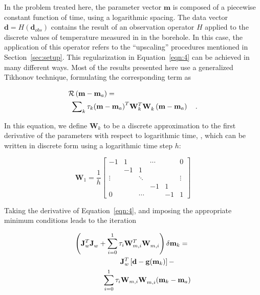 \documentclass[cp]{copernicus}
\begin{document}
In the problem treated here, the parameter vector $\mathbf{m}$ is composed of a piecewise constant 
function of time, using a logarithmic spacing. The data vector $\mathbf{d} = H(\mathbf{d}_{obs})$ 
contains the result of an observation operator $H$ applied to the discrete values of temperature 
measured in in the borehole. In this case, the application of this operator refers to the 
“upscaling” procedures mentioned in Section~\ref{sec:setup}. This regularization in 
Equation~\ref{eqn:4} can be achieved in many different ways. Most of the results presented here use 
a generalized Tikhonov technique, formulating the corresponding term as

\begin{equation}
\label{eqn:5}
\begin{gathered}
  \mathcal{R}\left( {{\mathbf{m}} - {{\mathbf{m}}_a}} \right) =  \hfill \\
  {\text{        }}\sum\nolimits_k {{\tau _k}} {\left( {{\mathbf{m}} - {{\mathbf{m}}_a}} 
\right)^T}{\mathbf{W}}_k^T{\mathbf{W}}_k^{}\left( {{\mathbf{m}} - {{\mathbf{m}}_a}} \right) \quad. 
\hfill \\ 
\end{gathered} 
\end{equation} 

In this equation, we define $\mathbf{W}_k$ to be a discrete approximation to the
first derivative of the parameters with respect to logarithmic time, 
\cite[see][]{Aster2013a}, which can be written in discrete form using a 
logarithmic time step $h$:
 	 
\begin{equation}\label{eqn:6}
{{\mathbf{W}}_1} = \frac{1}{h}\left[ {\begin{array}{*{20}{c}}
  { - 1}&1&{}& \cdots &{}&0 \\ 
  {}&{ - 1}&1&{}&{}&{} \\ 
   \vdots &{}& \ddots &{}&{}& \vdots  \\ 
  {}&{}&{}&{ - 1}&1&{} \\ 
  0&{}& \cdots &{}&{ - 1}&1 
\end{array}} \right]\end{equation} 

Taking the derivative of Equation~\ref{eqn:4}, and imposing the appropriate minimum conditions leads 
to the iteration
	
\begin{equation}\label{eqn:7}
\begin{gathered}
  \left(\mathbf{J}_w^T\mathbf{J}_w^{} + 
  \sum\limits_{i = 0}^1 \tau_i \mathbf{W}_{m,i}^T\mathbf{W}_{m,i}^{}\right)      
  \delta\mathbf{m}_k =  \hfill \\
  \quad \quad \quad \quad \mathbf{J}_w^T\left[\mathbf{d}-
  \mathbf{g}(\mathbf{m}_k) \right] - \\
  \quad \quad \quad \quad  \sum\limits_{i = 0}^1 \tau _i \mathbf{W}_{m,i} 
  \mathbf{W}_{m,i}^{}(\mathbf{m}_k - \mathbf{m}_a) \hfill \\ 
\end{gathered}
\end{equation} 
\end{document}
